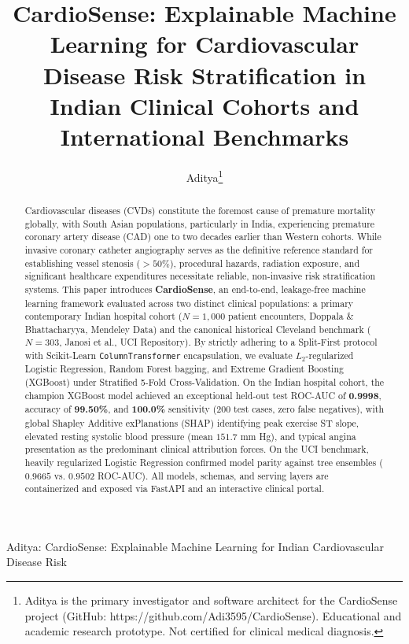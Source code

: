 \documentclass[journal]{IEEEtran}
\begin{document}
\title{CardioSense: Explainable Machine Learning for Cardiovascular Disease Risk Stratification in Indian Clinical Cohorts and International Benchmarks}

\author{Aditya\thanks{Aditya is the primary investigator and software architect for the CardioSense project (GitHub: https://github.com/Adi3595/CardioSense). Educational and academic research prototype. Not certified for clinical medical diagnosis.}}

%
{Aditya: CardioSense: Explainable Machine Learning for Indian Cardiovascular Disease Risk}

\maketitle

\begin{abstract}
Cardiovascular diseases (CVDs) constitute the foremost cause of premature mortality globally, with South Asian populations, particularly in India, experiencing premature coronary artery disease (CAD) one to two decades earlier than Western cohorts. While invasive coronary catheter angiography serves as the definitive reference standard for establishing vessel stenosis ($>50\%$), procedural hazards, radiation exposure, and significant healthcare expenditures necessitate reliable, non-invasive risk stratification systems. This paper introduces \textbf{CardioSense}, an end-to-end, leakage-free machine learning framework evaluated across two distinct clinical populations: a primary contemporary Indian hospital cohort ($N=1,000$ patient encounters, Doppala \& Bhattacharyya, Mendeley Data) and the canonical historical Cleveland benchmark ($N=303$, Janosi et al., UCI Repository). By strictly adhering to a Split-First protocol with Scikit-Learn \texttt{ColumnTransformer} encapsulation, we evaluate $L_2$-regularized Logistic Regression, Random Forest bagging, and Extreme Gradient Boosting (XGBoost) under Stratified 5-Fold Cross-Validation. On the Indian hospital cohort, the champion XGBoost model achieved an exceptional held-out test ROC-AUC of \textbf{0.9998}, accuracy of \textbf{99.50\%}, and \textbf{100.0\%} sensitivity ($200$ test cases, zero false negatives), with global Shapley Additive exPlanations (SHAP) identifying peak exercise ST slope, elevated resting systolic blood pressure (mean $151.7$ mm Hg), and typical angina presentation as the predominant clinical attribution forces. On the UCI benchmark, heavily regularized Logistic Regression confirmed model parity against tree ensembles ($0.9665$ vs. $0.9502$ ROC-AUC). All models, schemas, and serving layers are containerized and exposed via FastAPI and an interactive clinical portal.
\end{abstract}
\end{document}
